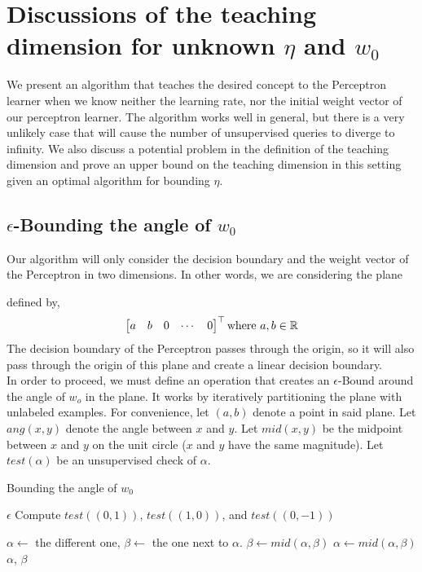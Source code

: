 \documentclass{article}
\begin{document}
\section{Discussions of the teaching dimension for unknown $\eta$ and $w_0$}

We present an algorithm that teaches the desired concept to the Perceptron
learner when we know neither the learning rate, nor the initial weight vector of
our perceptron learner. The algorithm works well in general, but there is a very
unlikely case that will cause the number of unsupervised queries to diverge to
infinity. We also discuss a potential problem in the definition of the teaching
dimension and prove an upper bound on the teaching dimension in this setting
given an optimal algorithm for bounding $\eta$.

\subsection{$\epsilon$-Bounding the angle of $w_0$}
Our algorithm will only consider the decision boundary and the weight vector of
the Perceptron in two dimensions. In other words, we are considering the plane

defined by,
\[
  \begin{bmatrix}
    a & b & 0 & \cdots & 0
  \end{bmatrix} ^ \top
  \textnormal{where}
  \ a, b \in \mathbb{R}
\]
The decision boundary of the Perceptron passes through the origin, so it will
also pass through the origin of this plane and create a linear decision
boundary.
\\

In order to proceed, we must define an operation that creates an
$\epsilon$-Bound around the angle of $w_o$ in the plane. It works by iteratively
partitioning the plane with unlabeled examples. For convenience, let $(a,b)$
denote a point in said plane. Let $ang(x,y)$ denote the angle between $x$ and
$y$. Let $mid(x, y)$ be the midpoint between $x$ and $y$ on the unit circle
($x$ and $y$ have the same magnitude). Let $test(\alpha)$ be an unsupervised
check of $\alpha$.

\begin{algorithm}
\caption{Bounding the angle of $w_0$}
\begin{algorithmic}[1]
	\REQUIRE $\epsilon$
  \STATE Compute $test((0,1))$, $test((1,0))$, and $test((0,-1))$

  \STATE $\alpha \leftarrow $ the different one, $\beta \leftarrow $ the one
  next to $\alpha$.
  \STATE $\beta \leftarrow mid(\alpha, \beta)$
  \ELSE
  \STATE $\alpha \leftarrow mid(\alpha, \beta)$
  \ENDIF
  \ENDFOR
  \RETURN $\alpha$, $\beta$
  
\end{algorithmic}
\end{algorithm}
\end{document}
